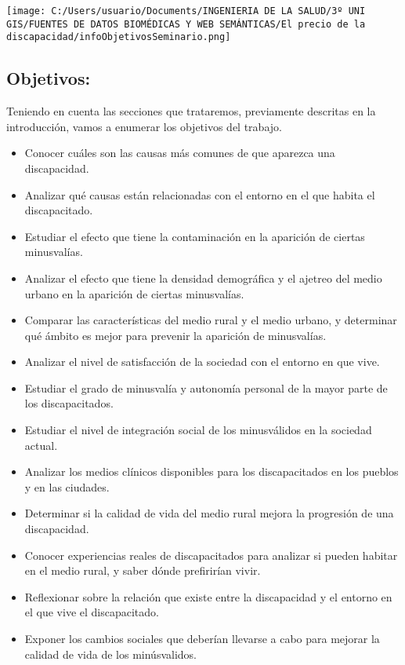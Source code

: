 \documentclass[
]{article}
\begin{document}
\texttt{[image: C:/Users/usuario/Documents/INGENIERIA DE LA SALUD/3º UNI GIS/FUENTES DE DATOS BIOMÉDICAS Y WEB SEMÁNTICAS/El precio de la discapacidad/infoObjetivosSeminario.png]}

\hypertarget{objetivos}{%
\subsection{Objetivos:}\label{objetivos}}

Teniendo en cuenta las secciones que trataremos, previamente descritas
en la introducción, vamos a enumerar los objetivos del trabajo.

\begin{itemize}
\item
  Conocer cuáles son las causas más comunes de que aparezca una
  discapacidad.
\item
  Analizar qué causas están relacionadas con el entorno en el que habita
  el discapacitado.
\item
  Estudiar el efecto que tiene la contaminación en la aparición de
  ciertas minusvalías.
\item
  Analizar el efecto que tiene la densidad demográfica y el ajetreo del
  medio urbano en la aparición de ciertas minusvalías.
\item
  Comparar las características del medio rural y el medio urbano, y
  determinar qué ámbito es mejor para prevenir la aparición de
  minusvalías.
\item
  Analizar el nivel de satisfacción de la sociedad con el entorno en que
  vive.
\item
  Estudiar el grado de minusvalía y autonomía personal de la mayor parte
  de los discapacitados.
\item
  Estudiar el nivel de integración social de los minusválidos en la
  sociedad actual.
\item
  Analizar los medios clínicos disponibles para los discapacitados en
  los pueblos y en las ciudades.
\item
  Determinar si la calidad de vida del medio rural mejora la progresión
  de una discapacidad.
\item
  Conocer experiencias reales de discapacitados para analizar si pueden
  habitar en el medio rural, y saber dónde prefirirían vivir.
\item
  Reflexionar sobre la relación que existe entre la discapacidad y el
  entorno en el que vive el discapacitado.
\item
  Exponer los cambios sociales que deberían llevarse a cabo para mejorar
  la calidad de vida de los minúsvalidos.
\end{itemize}
\end{document}
